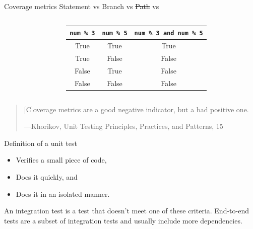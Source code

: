 \documentclass[english,handout,10pt,aspectratio=169,t]{beamer}
\begin{document}
\begin{frame}{Coverage metrics}
  Statement vs Branch vs \sout{Path} vs 
  \begin{columns}[T]
    \begin{column}[]{0.5\textwidth}
      \begin{minipage}{\linewidth}
        \coveragecode
      \end{minipage}
    \end{column}
    \begin{column}[]{0.5\textwidth}
      \begin{center}
        \begin{tabular}{ ccc }
          \hline
          \texttt{num \% 3} & \texttt{num \% 5} & \texttt{num \% 3 and num \% 5} \\
          \hline
          True & True & True \\
          True & False & False \\
          False & True & False \\
          False & False & False \\
          \hline
        \end{tabular}
      \end{center}
    \end{column}
  \end{columns}
\end{frame}

\begin{frame}
  \vfill
  \begin{quote}
    [C]overage metrics are a good negative indicator, but a bad positive one.
    \begin{flushright}
      \tiny{---Khorikov, \textup{Unit Testing Principles, Practices, and Patterns}, 15}
    \end{flushright}
  \end{quote}
  \vfill
\end{frame}

\begin{frame}{Definition of a unit test}
  \begin{itemize}
    \item Verifies a small piece of code,
    \item Does it quickly, and
    \item Does it in an isolated manner.
  \end{itemize}

  An integration test is a test that doesn't meet one of these criteria. End-to-end
  tests are a subset of integration tests and usually include more dependencies.
\end{frame}
\end{document}
